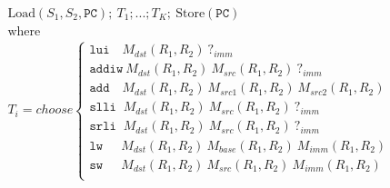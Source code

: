 \begin{align*}
&\text{Load}(S_1, S_2, \texttt{PC}); \ 
T_1; ...; T_K; \ 
\text{Store}(\texttt{PC}) \\
&\text{where}\\
&T_i = choose
\begin{cases}
  \texttt{lui  }\ \ \ M_{dst}(R_1, R_2)\ \textbf{?}_{imm}\\
  \texttt{addiw}\ M_{dst}(R_1, R_2)\ M_{src}(R_1, R_2)\ \textbf{?}_{imm}\\
  \texttt{add  }\ \ \ M_{dst}(R_1, R_2)\ M_{src1}(R_1, R_2)\ M_{src2}(R_1, R_2)\\
  \texttt{slli }\ M_{dst}(R_1, R_2)\ M_{src}(R_1, R_2)\ \textbf{?}_{imm}\\
  \texttt{srli }\ M_{dst}(R_1, R_2)\ M_{src}(R_1, R_2)\ \textbf{?}_{imm}\\
  \texttt{lw }\ \ \ \ \ M_{dst}(R_1, R_2)\ M_{base}(R_1, R_2)\ M_{imm}(R_1, R_2)\\
  \texttt{sw }\ \ \ \ \ M_{dst}(R_1, R_2)\ M_{src}(R_1, R_2)\ M_{imm}(R_1, R_2)\\
\end{cases}\\
\end{align*}
